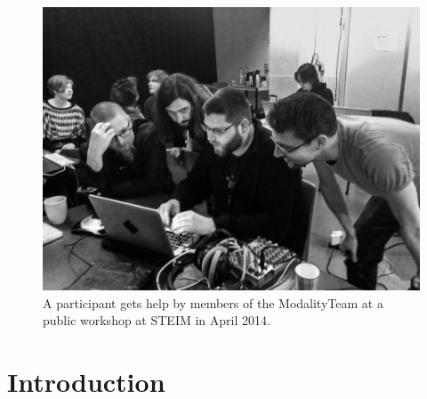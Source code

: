 \documentclass{article}
\title{\papertitle}
\begin{document}
%
\capstartfalse
\maketitle
\capstarttrue
%
\begin{abstract}
The Modality Toolkit aims to improve and facilitate the use of digital technology within interactive sound art and music. 
Written in SuperCollider, it simplifies the creation of individual electronic instruments by combining custom sound engines with off-the-shelf controllers. 
To this end, a common code interface, |MKtl|, is used to connect controllers from various sources and protocols. 
Currently, HID and MIDI are supported; GUI-based interfaces can be created on the fly from interface descriptions.

In the workshop, the toolkit is introduced and used by participants to lay out their control ideas and play music with each other.
\end{abstract}

\begin{figure}[h]
	\centering
		\includegraphics[width=\columnwidth]{../media/20140403-IMG_1667.jpg}
	\caption{A participant gets help by members of the ModalityTeam at a public workshop at STEIM in April 2014.}
	\label{fig:media_20140331-IMG_5976}
\end{figure}




\section{Introduction}
\label{sec:introduction}
\end{document}

